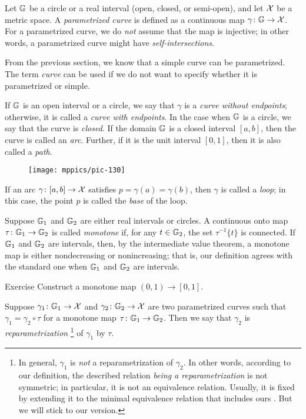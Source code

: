 Let $\mathbb{G}$ be a circle or a real interval (open, closed, or semi-open), and let $\mathcal{X}$ be a metric space.
A \emph{parametrized curve} is defined as a continuous map $\gamma\colon\mathbb{G}\to\mathcal{X}$. 
For a parametrized curve, we do \textit{not} assume that the map is injective; in other words, a parametrized curve might have {}\emph{self-intersections}.

From the previous section, we know that a simple curve can be parametrized.
The term \emph{curve} can be used if we do not want to specify whether it is parametrized or simple.

If $\mathbb{G}$ is an open interval or a circle, we say that $\gamma$ is a {}\emph{curve without endpoints};
otherwise, it is called a {}\emph{curve with endpoints}.
In the case when $\mathbb{G}$ is a circle, we say that the curve is \emph{closed}. 
If the domain $\mathbb{G}$ is a closed interval $[a,b]$, then the curve is called an \emph{arc}.
Further, if it is the unit interval $[0,1]$, then it is also called a \emph{path}.

\begin{wrapfigure}{o}{15 mm}
\vskip-0mm
\centering
\texttt{[image: mppics/pic-130]}
\end{wrapfigure}


If an arc $\gamma \colon [a,b] \to \mathcal{X}$ satisfies $p=\gamma (a)=\gamma (b)$, then $\gamma$ is called a \emph{loop};
in this case, the point $p$ is called the \emph{base} of the loop.

Suppose $\mathbb{G}_1$ and $\mathbb{G}_2$ are either real intervals or circles.
A continuous onto map $\tau\colon\mathbb{G}_1\to\mathbb{G}_2$ is called \emph{monotone} if, for any $t\in \mathbb{G}_2$, the set $\tau^{-1}\{t\}$ is connected.
If $\mathbb{G}_1$ and $\mathbb{G}_2$ are intervals, then, by the intermediate value theorem, a monotone map is either nondecreasing or nonincreasing;
that is, our definition agrees with the standard one when $\mathbb{G}_1$ and $\mathbb{G}_2$ are intervals.

\begin{thm}{Exercise}\label{ex:mono}
Construct a monotone map $(0,1)\to [0,1]$.
\end{thm}


Suppose $\gamma_1\colon\mathbb{G}_1\to \mathcal{X}$ and $\gamma_2\colon\mathbb{G}_2\to \mathcal{X}$ are two parametrized curves such that 
$\gamma_1=\gamma_2\circ\tau$ for a monotone map $\tau\colon\mathbb{G}_1\to\mathbb{G}_2$.
Then we say that $\gamma_2$ is \emph{reparametrization}%
\footnote{In general, $\gamma_1$ is \textit{not} a reparametrization of $\gamma_2$.
In other words, according to our definition, the described relation \textit{being a reparametrization} is not symmetric;
in particular, it is not an equivalence relation.
Usually, it is fixed by extending it to the minimal equivalence relation that includes ours \cite[2.5.1]{burago-burago-ivanov}.
But we will stick to our version.}
of $\gamma_1$ by $\tau$.


